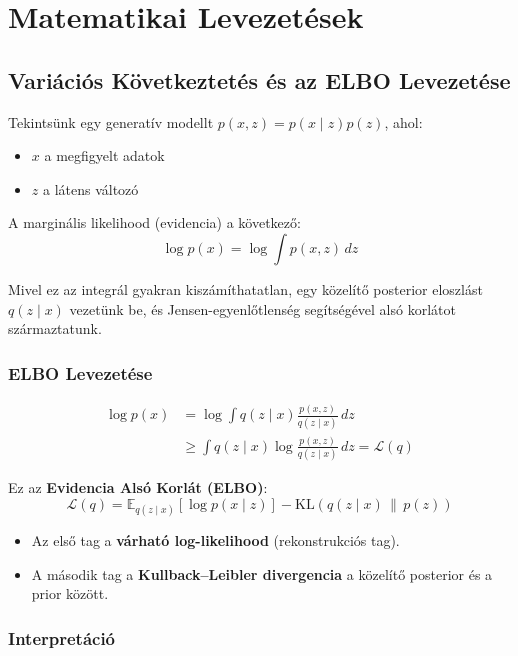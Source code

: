 \chapter{Matematikai Levezetések}
\section{Variációs Következtetés és az ELBO Levezetése}

Tekintsünk egy generatív modellt $p(x, z) = p(x \mid z)p(z)$, ahol:
\begin{itemize}
    \item $x$ a megfigyelt adatok
    \item $z$ a látens változó
\end{itemize}

A marginális likelihood (evidencia) a következő:
\begin{equation}
\log p(x) = \log \int p(x, z) \, dz
\end{equation}

Mivel ez az integrál gyakran kiszámíthatatlan, egy közelítő posterior eloszlást $q(z \mid x)$ vezetünk be, és Jensen-egyenlőtlenség segítségével alsó korlátot származtatunk.

\subsection{ELBO Levezetése}

\begin{align}
\log p(x) &= \log \int q(z \mid x) \frac{p(x, z)}{q(z \mid x)} \, dz \\
&\geq \int q(z \mid x) \log \frac{p(x, z)}{q(z \mid x)} \, dz = \mathcal{L}(q)
\end{align}

Ez az \textbf{Evidencia Alsó Korlát (ELBO)}:
\begin{equation}
\mathcal{L}(q) = \mathbb{E}_{q(z \mid x)}[\log p(x \mid z)] - \text{KL}(q(z \mid x) \, \| \, p(z))
\end{equation}

\begin{itemize}
    \item Az első tag a \textbf{várható log-likelihood} (rekonstrukciós tag).
    \item A második tag a \textbf{Kullback–Leibler divergencia} a közelítő posterior és a prior között.
\end{itemize}

\subsection{Interpretáció}

